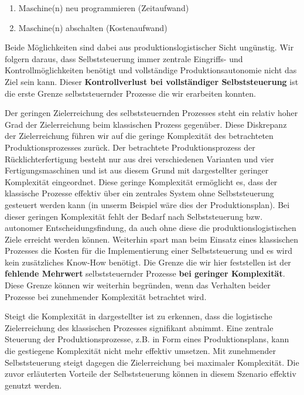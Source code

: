\begin{enumerate}
  \item Maschine(n) neu programmieren (Zeitaufwand)
  \item Maschine(n) abschalten (Kostenaufwand)
\end{enumerate}

Beide Möglichkeiten sind dabei aus produktionslogistischer Sicht ungünstig.
Wir folgern daraus, dass Selbststeuerung immer zentrale Eingriffs- und Kontrollmöglichkeiten
benötigt und vollständige Produktionsautonomie nicht das Ziel sein kann. Dieser \textbf{Kontrollverlust
bei vollständiger Selbststeuerung} ist die erste Grenze selbststeuernder Prozesse
die wir erarbeiten konnten.

Der geringen Zielerreichung des selbststeuernden Prozesses steht ein relativ
hoher Grad der Zielerreichung beim klassischen Prozess gegenüber.
Diese Diskrepanz der Zielerreichung führen wir auf die geringe
Komplexität des betrachteten Produktionsprozesses zurück.
Der betrachtete Produktionsprozess der Rücklichterfertigung besteht nur aus
drei verschiedenen Varianten und vier Fertigungsmaschinen und ist aus diesem
Grund mit dargestellter geringer Komplexität eingeordnet. Diese geringe
Komplexität ermöglicht es, dass der klassische Prozesse effektiv über ein zentrales
System ohne Selbststeuerung gesteuert werden kann (in unserm Beispiel wäre dies der Produktionsplan).
Bei dieser geringen Komplexität fehlt der Bedarf nach Selbststeuerung bzw. autonomer Entscheidungsfindung,
da auch ohne diese die produktionslogistischen Ziele erreicht werden können.
Weiterhin spart man beim Einsatz eines klassischen Prozesses die Kosten für 
die Implementierung einer Selbststeuerung und es wird kein zusätzliches 
Know-How benötigt. Die Grenze die wir hier feststellen ist der \textbf{fehlende Mehrwert}
selbststeuernder Prozesse \textbf{bei geringer Komplexität}.
Diese Grenze können wir weiterhin begründen, wenn das Verhalten beider Prozesse
bei zunehmender Komplexität betrachtet wird.

Steigt die Komplexität in dargestellter  ist zu erkennen,
dass die logistische Zielerreichung des klassischen Prozesses signifikant abnimmt.
Eine zentrale Steuerung der Produktionsprozesse, z.B. in Form eines Produktionsplans,
kann die gestiegene Komplexität nicht mehr effektiv umsetzen. Mit zunehmender 
Selbststeuerung steigt dagegen die Zielerreichung bei maximaler Komplexität. Die 
zuvor erläuterten Vorteile der Selbststeuerung können in diesem Szenario effektiv
genutzt werden.


